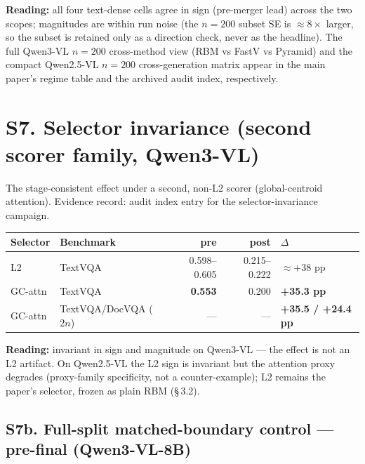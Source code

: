\documentclass[journal]{IEEEtran}
\begin{document}
\noindent\textbf{Reading:} all four text-dense cells agree in sign (pre-merger
lead) across the two scopes; magnitudes are within run noise (the $n = 200$
subset SE is $\approx 8\times$ larger, so the subset is retained only as a
direction check, never as the headline). The full Qwen3-VL $n = 200$
cross-method view (RBM vs FastV vs Pyramid) and the compact Qwen2.5-VL
$n = 200$ cross-generation matrix appear in the main paper's regime table and
the archived audit index, respectively.

\section*{S7. Selector invariance (second scorer family, Qwen3-VL)}

The stage-consistent effect under a second, non-L2 scorer (global-centroid attention).
Evidence record: audit index entry for the selector-invariance
campaign.

\begin{table}[ht]
  \centering
  \scriptsize
  \setlength{\tabcolsep}{2pt}
  \begin{tabular}{@{}l l r r l@{}}
    \toprule
    Selector & Benchmark & pre & post & $\Delta$ \\
    \midrule
    L2       & TextVQA              & 0.598--0.605 & 0.215--0.222 & $\approx +38$ pp \\
    GC-attn  & TextVQA              & \textbf{0.553} & 0.200 & \textbf{+35.3 pp} \\
    GC-attn  & TextVQA/DocVQA ($2n$)& --- & --- & \textbf{+35.5 / +24.4 pp} \\
    \bottomrule
  \end{tabular}
\end{table}

\noindent\textbf{Reading:} invariant in sign and magnitude on Qwen3-VL --- the
effect is not an L2 artifact. On Qwen2.5-VL the L2 sign is invariant but the
attention proxy degrades (proxy-family specificity, not a counter-example); L2
remains the paper's selector, frozen as plain RBM (\S\,3.2).

\subsection*{S7b. Full-split matched-boundary control --- pre-final (Qwen3-VL-8B)}
\end{document}
